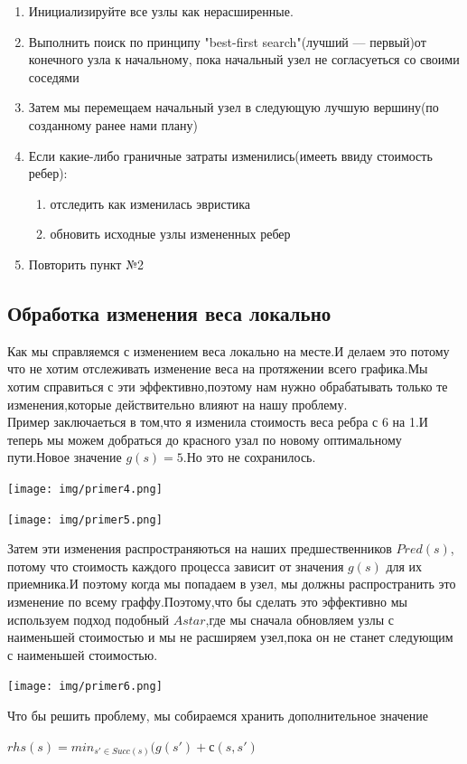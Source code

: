 \documentclass[12pt]{article}
\begin{document}
\begin{enumerate}
    \item Инициализируйте все узлы как нерасширенные.
    \item Выполнить поиск по принципу "best-first search"(лучший — первый)от конечного узла к начальному, пока начальный узел не согласуеться со своими соседями
    \item Затем мы перемещаем начальный узел в следующую лучшую вершину(по созданному ранее нами плану)
    \item Если какие-либо граничные затраты изменились(имееть ввиду стоимость ребер):
    \begin{enumerate} 
        \item отследить как изменилась эвристика
        \item обновить исходные узлы измененных ребер
    \end{enumerate}
    \item Повторить пункт №2
\end{enumerate}
\hypertarget{b5}{\subsection*{Обработка изменения веса локально}}
Как мы справляемся с изменением веса локально на месте.И делаем это потому что не хотим отслеживать изменение веса на протяжении всего графика.Мы хотим справиться с эти эффективно,поэтому нам нужно обрабатывать только те изменения,которые действительно влияют на нашу проблему.\\
Пример заключаеться в том,что я изменила стоимость веса ребра с 6 на 1.И теперь мы можем добраться до красного узал по новому оптимальному пути.Новое значение $g(s)=5$.Но это не сохранилось.
\begin{center}
        \texttt{[image: img/primer4.png]}
\end{center}
\begin{center}
        \texttt{[image: img/primer5.png]}
\end{center}
Затем эти изменения распространяються на наших предшественников $Pred(s)$, потому что стоимость каждого процесса зависит от значения $g(s)$ для их приемника.И поэтому когда мы попадаем в узел, мы должны распространить это изменение по всему граффу.Поэтому,что бы сделать это эффективно мы используем подход подобный $A star$,где мы сначала обновляем узлы с наименьшей стоимостью и мы не расширяем узел,пока он не станет следующим с наименьшей стоимостью.
\begin{center}
        \texttt{[image: img/primer6.png]}
\end{center}
Что бы решить проблему, мы собираемся хранить дополнительное значение 
\begin{center}
       $rhs(s)=min_{s'\in Succ(s)}(g(s')+с(s,s')$
\end{center}
\end{document}
